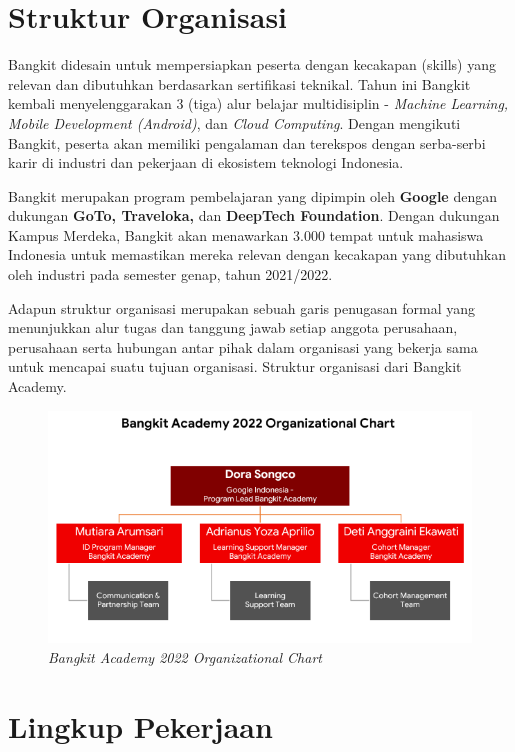 \section{Struktur Organisasi}

Bangkit didesain untuk mempersiapkan peserta dengan kecakapan (skills) yang relevan dan dibutuhkan berdasarkan sertifikasi teknikal. Tahun ini Bangkit kembali menyelenggarakan 3 (tiga) alur belajar multidisiplin -\textit{ Machine Learning, Mobile Development (Android)}, dan \textit{Cloud Computing}. Dengan mengikuti Bangkit, peserta akan memiliki pengalaman dan terekspos dengan serba-serbi karir di industri dan pekerjaan di ekosistem teknologi Indonesia.

Bangkit merupakan program pembelajaran yang dipimpin oleh \textbf{Google} dengan dukungan \textbf{GoTo, Traveloka,} dan \textbf{DeepTech Foundation}. Dengan dukungan Kampus Merdeka, Bangkit akan menawarkan 3.000 tempat untuk mahasiswa Indonesia untuk memastikan mereka relevan dengan kecakapan yang dibutuhkan oleh industri pada semester genap, tahun 2021/2022.

Adapun struktur organisasi merupakan sebuah garis penugasan formal yang menunjukkan alur tugas dan tanggung jawab setiap anggota perusahaan, perusahaan serta hubungan antar pihak dalam organisasi yang bekerja sama untuk mencapai suatu tujuan organisasi. Struktur organisasi dari Bangkit Academy.

\begin{figure}
    \centering
    \includegraphics[width=\textwidth]{chapters/images/bangkit-2022-org-diagram.png}
    \caption{\textit{Bangkit Academy 2022 Organizational Chart}}
    \label{fig:gambar3.1}
\end{figure}

\section{Lingkup Pekerjaan} \label{lingkup-pekerjaan}

